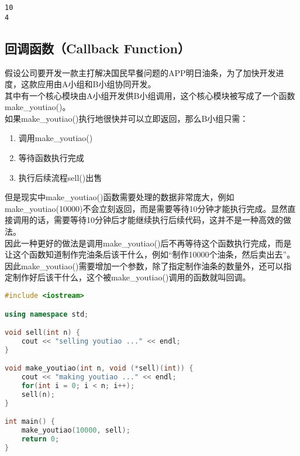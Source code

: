 \begin{tcolorbox}
	\begin{verbatim}
10
4
	\end{verbatim}
\end{tcolorbox}

\vspace{0.5cm}

\subsection{回调函数（Callback Function）}

假设公司要开发一款主打解决国民早餐问题的APP明日油条，为了加快开发进度，这款应用由A小组和B小组协同开发。\\

其中有一个核心模块由A小组开发供B小组调用，这个核心模块被写成了一个函数make\_youtiao()。\\

如果make\_youtiao()执行地很快并可以立即返回，那么B小组只需：

\begin{enumerate}
	\item 调用make\_youtiao()
	\item 等待函数执行完成
	\item 执行后续流程sell()出售
\end{enumerate}

但是现实中make\_youtiao()函数需要处理的数据非常庞大，例如make\_youtiao(10000)不会立刻返回，而是需要等待10分钟才能执行完成。显然直接调用的话，需要等待10分钟后才能继续执行后续代码，这并不是一种高效的做法。\\

因此一种更好的做法是调用make\_youtiao()后不再等待这个函数执行完成，而是让这个函数知道制作完油条后该干什么，例如“制作10000个油条，然后卖出去”。\\

因此make\_youtiao()需要增加一个参数，除了指定制作油条的数量外，还可以指定制作好后该干什么，这个被make\_youtiao()调用的函数就叫回调。\\


\begin{lstlisting}[language=C++]
#include <iostream>

using namespace std;

void sell(int n) {
    cout << "selling youtiao ..." << endl;
}

void make_youtiao(int n, void (*sell)(int)) {
    cout << "making youtiao ..." << endl;
    for(int i = 0; i < n; i++);
    sell(n);
}

int main() {
    make_youtiao(10000, sell);
    return 0;
}
\end{lstlisting}

